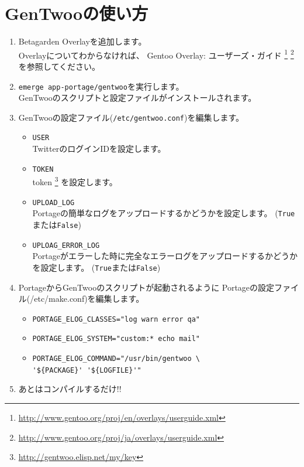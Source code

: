 \documentclass[10pt,foldmark,notumble]{leaflet}
\begin{document}
\section{GenTwooの使い方}
	\begin{enumerate}
		\item Betagarden Overlayを追加します。 \\
			Overlayについてわからなければ、
			Gentoo Overlay: ユーザーズ・ガイド
			\footnote{\url{http://www.gentoo.org/proj/en/overlays/userguide.xml}}
			\footnote{\url{http://www.gentoo.org/proj/ja/overlays/userguide.xml}}
			を参照してください。
		\item \verb|emerge app-portage/gentwoo|を実行します。 \\
			GenTwooのスクリプトと設定ファイルがインストールされます。
		\item GenTwooの設定ファイル(\verb|/etc/gentwoo.conf|)を編集します。
			\begin{itemize}
				\item \verb|USER| \\
					TwitterのログインIDを設定します。
				\item \verb|TOKEN| \\
					token
					\footnote{\url{http://gentwoo.elisp.net/my/key}}
					を設定します。
				\item \verb|UPLOAD_LOG| \\
					Portageの簡単なログをアップロードするかどうかを設定します。
					(\verb|True|または\verb|False|)
				\item \verb|UPLOAG_ERROR_LOG| \\
					Portageがエラーした時に完全なエラーログをアップロードするかどうかを設定します。
					(\verb|True|または\verb|False|)
			\end{itemize}
		\item PortageからGenTwooのスクリプトが起動されるように
			Portageの設定ファイル(/etc/make.conf)を編集します。
			\begin{itemize}
				\item \verb|PORTAGE_ELOG_CLASSES="log warn error qa"|
				\item \verb|PORTAGE_ELOG_SYSTEM="custom:* echo mail"|
				\item \verb|PORTAGE_ELOG_COMMAND="/usr/bin/gentwoo \| \\
					\hspace{25mm} \verb|'${PACKAGE}' '${LOGFILE}'"|
			\end{itemize}
		\item あとはコンパイルするだけ!!
	\end{enumerate}
\newpage
\end{document}
